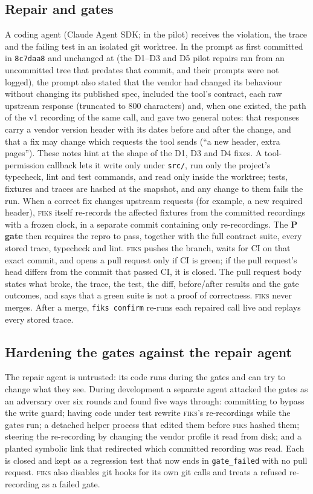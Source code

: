 \documentclass[10pt]{article}
\newcommand{\fiks}{\textsc{fiks}}
\begin{document}
\subsection{Repair and gates}
A coding agent (Claude Agent SDK; \repairModel{} in the pilot) receives the violation, the trace and the failing test in an isolated git worktree. In the prompt as first committed in \texttt{8c7daa8} and unchanged at \texttt{\fiksSha} (the D1--D3 and D5 pilot repairs ran from an uncommitted tree that predates that commit, and their prompts were not logged), the prompt also stated that the vendor had changed its behaviour without changing its published spec, included the tool's contract, each raw upstream response (truncated to 800 characters) and, when one existed, the path of the v1 recording of the same call, and gave two general notes: that responses carry a vendor version header with its dates before and after the change, and that a fix may change which requests the tool sends (``a new header, extra pages''). These notes hint at the shape of the D1, D3 and D4 fixes.
A tool-permission callback lets it write only under \texttt{src/}, run only the project's typecheck, lint and test commands, and read only inside the worktree; tests, fixtures and traces are hashed at the snapshot, and any change to them fails the run.
When a correct fix changes upstream requests (for example, a new required header), \fiks{} itself re-records the affected fixtures from the committed recordings with a frozen clock, in a separate commit containing only re-recordings.
The \textbf{P gate} then requires the repro to pass, together with the full contract suite, every stored trace, typecheck and lint.
\fiks{} pushes the branch, waits for CI on that exact commit, and opens a pull request only if CI is green; if the pull request's head differs from the commit that passed CI, it is closed.
The pull request body states what broke, the trace, the test, the diff, before/after results and the gate outcomes, and says that a green suite is not a proof of correctness.
\fiks{} never merges. After a merge, \texttt{fiks confirm} re-runs each repaired call live and replays every stored trace.

\subsection{Hardening the gates against the repair agent}
\label{sec:hardening}
The repair agent is untrusted: its code runs during the gates and can try to change what they see. During development a separate agent attacked the gates as an adversary over six rounds and found five ways through: committing to bypass the write guard; having code under test rewrite \fiks{}'s re-recordings while the gates run; a detached helper process that edited them before \fiks{} hashed them; steering the re-recording by changing the vendor profile it read from disk; and a planted symbolic link that redirected which committed recording was read. Each is closed and kept as a regression test that now ends in \texttt{gate\_failed} with no pull request. \fiks{} also disables git hooks for its own git calls and treats a refused re-recording as a failed gate.
\end{document}
